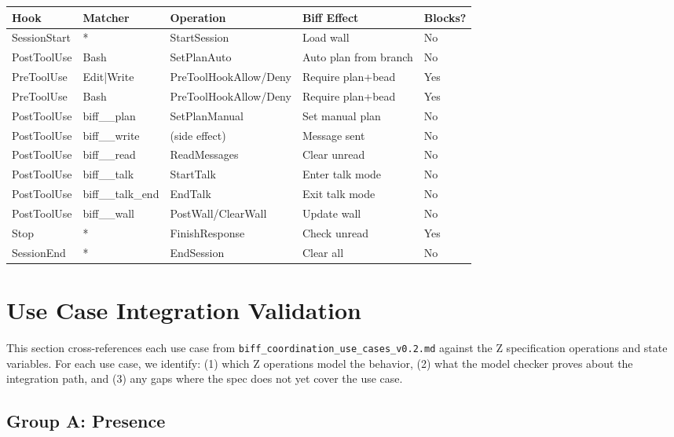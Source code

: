 \documentclass[a4paper,10pt,fleqn]{article}
\begin{document}
\begin{tabular}{lllll}
\hline
\textbf{Hook} & \textbf{Matcher} & \textbf{Operation} & \textbf{Biff Effect} & \textbf{Blocks?} \\
\hline
SessionStart & * & StartSession & Load wall & No \\
PostToolUse & Bash & SetPlanAuto & Auto plan from branch & No \\
PreToolUse & Edit|Write & PreToolHookAllow/Deny & Require plan+bead & Yes \\
PreToolUse & Bash & PreToolHookAllow/Deny & Require plan+bead & Yes \\
PostToolUse & biff\_\_plan & SetPlanManual & Set manual plan & No \\
PostToolUse & biff\_\_write & (side effect) & Message sent & No \\
PostToolUse & biff\_\_read & ReadMessages & Clear unread & No \\
PostToolUse & biff\_\_talk & StartTalk & Enter talk mode & No \\
PostToolUse & biff\_\_talk\_end & EndTalk & Exit talk mode & No \\
PostToolUse & biff\_\_wall & PostWall/ClearWall & Update wall & No \\
Stop & * & FinishResponse & Check unread & Yes \\
SessionEnd & * & EndSession & Clear all & No \\
\hline
\end{tabular}

\section{Use Case Integration Validation}

This section cross-references each use case from
\texttt{biff\_coordination\_use\_cases\_v0.2.md} against the Z
specification operations and state variables. For each use case,
we identify: (1) which Z operations model the behavior, (2) what
the model checker proves about the integration path, and (3) any
gaps where the spec does not yet cover the use case.

\subsection{Group A: Presence}
\end{document}
